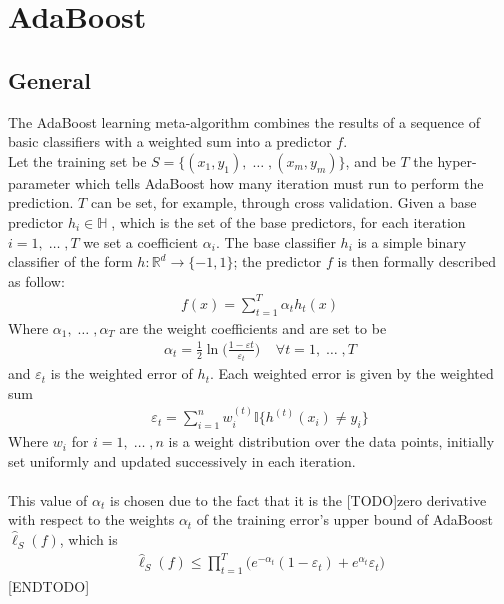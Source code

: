 
\chapter{AdaBoost}
\section{General}
	The AdaBoost learning meta-algorithm combines the results of a sequence of basic classifiers with a weighted sum into a predictor $f$. \\
	Let the training set be $S=\lbrace (x_{1}, y_{1}),\; \dots\;, (x_{m}, y_{m}) \rbrace$, and be $T$ the hyper-parameter which tells AdaBoost how many iteration must run to perform the prediction. $T$ can be set, for example, through cross validation. Given a base predictor $h_{i} \in \mathbb{H}\;$, which is the set of the base predictors, for each iteration $i = 1,\;\dots\;,T$ we set a coefficient $\alpha_{i}$. The base classifier $h_{i}$ is a simple binary classifier of the form $h:\mathbb{R}^{d}\to\lbrace-1, 1\rbrace$; the  predictor $f$ is then formally described as follow:
	\begin{align}
	\label{eq:weighted_sum}
		f(x) = \sum_{t=1}^{T}\alpha_{t}h_{t}(x)
	\end{align}
	Where $\alpha_{1},\;\dots\;,\alpha_{T}$ are the weight coefficients and are set to be
	\begin{align*}
		\alpha_{t} = \frac{1}{2}\ln \Big( \frac{1-\varepsilon{t}}{\varepsilon_{t}} \Big) \;\;\;\; \forall t=1,\;\dots\;,T
	\end{align*}
	and $\varepsilon_{t}$ is the weighted error of $h_{t}$. Each weighted error is given by the weighted sum
	\begin{align*}
		\varepsilon_{t} = \sum_{i=1}^{n} w_{i}^{(t)}\mathbb{I}\big\lbrace h^{(t)}(x_{i}) \neq y_{i} \big\rbrace
	\end{align*}
	Where $w_{i}$ for $i = 1,\;\dots\;, n$ is a weight distribution over the data points, initially set uniformly and updated successively in each iteration.\\\\
	This value of $\alpha_{t}$ is chosen due to the fact that it is the [TODO]zero derivative with respect to the weights $\alpha_{t}$ of the training error's upper bound of AdaBoost $\hat{\ell}_{S}(f)$, which is
	\begin{align*}
		\hat{\ell}_{S}(f) \leq \prod_{t=1}^{T}\big( e^{-\alpha_{t}}(1-\varepsilon_{t}) + e^{\alpha_{t}}\varepsilon_{t} \big)
	\end{align*}
	[ENDTODO]
	
